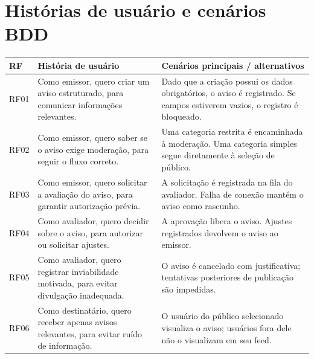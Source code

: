 \section{Histórias de usuário e cenários BDD}
\begin{table}[!ht]\centering\scriptsize\renewcommand{\arraystretch}{1.35}
\begin{tabularx}{\linewidth}{|>{\centering\arraybackslash}p{0.7cm}|>{\raggedright\arraybackslash}X|>{\raggedright\arraybackslash}X|}
\hline
\textbf{RF} & \textbf{História de usuário} & \textbf{Cenários principais / alternativos} \\
\hline
RF01 & Como emissor, quero criar um aviso estruturado, para comunicar informações relevantes. &
Dado que a criação possui os dados obrigatórios, o aviso é registrado. Se campos estiverem vazios, o registro é bloqueado. \\
\hline
RF02 & Como emissor, quero saber se o aviso exige moderação, para seguir o fluxo correto. &
Uma categoria restrita é encaminhada à moderação. Uma categoria simples segue diretamente à seleção de público. \\
\hline
RF03 & Como emissor, quero solicitar a avaliação do aviso, para garantir autorização prévia. &
A solicitação é registrada na fila do avaliador. Falha de conexão mantém o aviso como rascunho. \\
\hline
RF04 & Como avaliador, quero decidir sobre o aviso, para autorizar ou solicitar ajustes. &
A aprovação libera o aviso. Ajustes registrados devolvem o aviso ao emissor. \\
\hline
RF05 & Como avaliador, quero registrar inviabilidade motivada, para evitar divulgação inadequada. &
O aviso é cancelado com justificativa; tentativas posteriores de publicação são impedidas. \\
\hline
RF06 & Como destinatário, quero receber apenas avisos relevantes, para evitar ruído de informação. &
O usuário do público selecionado visualiza o aviso; usuários fora dele não o visualizam em seu feed. \\
\hline
\end{tabularx}
\end{table}
